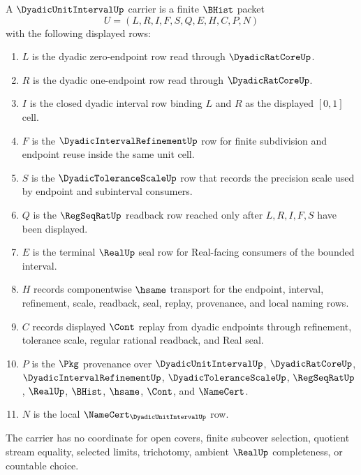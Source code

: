 \begin{definition}
\label{def:dyadic-unit-interval-carrier}
A $\DyadicUnitIntervalUp$ carrier is a finite $\BHist$ packet
$$
U=(L,R,I,F,S,Q,E,H,C,P,N)
$$
with the following displayed rows:
\begin{enumerate}
\item $L$ is the dyadic zero-endpoint row read through $\DyadicRatCoreUp$.
\item $R$ is the dyadic one-endpoint row read through $\DyadicRatCoreUp$.
\item $I$ is the closed dyadic interval row binding $L$ and $R$ as the displayed $[0,1]$ cell.
\item $F$ is the $\DyadicIntervalRefinementUp$ row for finite subdivision and endpoint reuse inside the same unit cell.
\item $S$ is the $\DyadicToleranceScaleUp$ row that records the precision scale used by endpoint and subinterval consumers.
\item $Q$ is the $\RegSeqRatUp$ readback row reached only after $L,R,I,F,S$ have been displayed.
\item $E$ is the terminal $\RealUp$ seal row for Real-facing consumers of the bounded interval.
\item $H$ records componentwise $\hsame$ transport for the endpoint, interval, refinement, scale, readback, seal, replay, provenance, and local naming rows.
\item $C$ records displayed $\Cont$ replay from dyadic endpoints through refinement, tolerance scale, regular rational readback, and Real seal.
\item $P$ is the $\Pkg$ provenance over $\DyadicUnitIntervalUp$, $\DyadicRatCoreUp$, $\DyadicIntervalRefinementUp$, $\DyadicToleranceScaleUp$, $\RegSeqRatUp$, $\RealUp$, $\BHist$, $\hsame$, $\Cont$, and $\NameCert$.
\item $N$ is the local $\NameCert_{\DyadicUnitIntervalUp}$ row.
\end{enumerate}
The carrier has no coordinate for open covers, finite subcover selection, quotient stream equality, selected limits, trichotomy, ambient $\RealUp$ completeness, or countable choice.
\end{definition}

